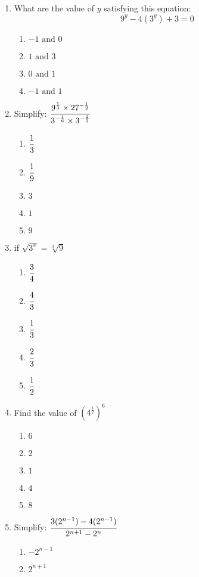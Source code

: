 \begin{multicols}{2}
\begin{enumerate}[label={\arabic*.}]
\item What are the value of $y$ satisfying this equation:
$$9^y -4(3^y) + 3 = 0$$
	\begin{enumerate}[label={\Alph*.}]
	\item \(-1 \text{ and } 0\)
	\item \(1 \text{ and } 3\)
	\item \(0 \text{ and } 1\)
	\item \(-1 \text{ and } 1\)
	\end{enumerate}
\item Simplify:  $\cfrac{9^{\frac{1}{3}} \times 27^{-\frac{1}{2}}}{3^{-\frac{1}{6}} \times 3^{-\frac{2}{3}}}$
	\begin{enumerate}[label={\Alph*.}]
	\item \(\cfrac{1}{3}\)
	\item \(\cfrac{1}{9}\)
	\item \(3\)
	\item \(1\)
	\item \(9\)
	\end{enumerate}
\item if $\sqrt{3^x} = \sqrt[3]{9}$
\begin{multicols}{3}
	\begin{enumerate}[label={\Alph*.}]
	\item \(\cfrac{3}{4}\)
	\item \(\cfrac{4}{3}\)
	\item \(\cfrac{1}{3}\)
	\item \(\cfrac{2}{3}\)
	\item \(\cfrac{1}{2}\)
	\end{enumerate}
\end{multicols}
\item Find the value of $\left(4^{\frac{1}{2}}\right)^6$
\begin{multicols}{3}
	\begin{enumerate}[label={\Alph*.}]
	\item \(6\)
	\item \(2\)
	\item \(1\)
	\item \(4\)
	\item \(8\)
	\end{enumerate}
\end{multicols}
\item Simplify: $\cfrac{3(2^{n-1}) - 4(2^{n-1})}{2^{n+1} - 2^n}$
	\begin{enumerate}[label={\Alph*.}]
	\item \(-2^{n-1}\)
	\item \(2^{n+1}\)

\end{enumerate}
\end{enumerate}
\end{multicols}
